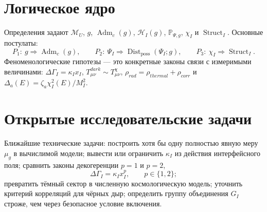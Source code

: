 \documentclass[12pt,a4paper]{article}
\DeclareMathOperator{\Adm}{Adm}
\DeclareMathOperator{\Struct}{Struct}
\DeclareMathOperator{\Dist}{Dist}
\newcommand{\M}{\mathcal M_U}
\newcommand{\Hilb}{\mathcal H}
\newcommand{\Prob}{\mathbb P}
\begin{document}
\section{Логическое ядро}
Определения задают $\M$, $g$, $\Adm_c(g)$, $\Hilb_I(g)$, $\Prob_{\Psi,g}$, $\chi_I$ и $\Struct_I$. Основные постулаты:
\[
\boxed{P_1:\ g\Rightarrow\Adm_c(g),}
\qquad
\boxed{P_2:\ \Psi_I\Rightarrow\Dist_{\mathrm{poss}}(\Psi_I;g),}
\qquad
\boxed{P_3:\ \chi_I\Rightarrow\Struct_I.}
\]
Феноменологические гипотезы — это конкретные законы связи с измеримыми величинами: $\Delta\Gamma_I=\kappa_Ix_I$, $T_{\mu\nu}^{dark}\sim T_{\mu\nu}^{\chi}$, $\rho_{rad}=\rho_{thermal}+\rho_{corr}$ и $\Delta_a(E)=\zeta_a\chi_I^2(E)/M_I^2$.

\section{Открытые исследовательские задачи}
Ближайшие технические задачи: построить хотя бы одну полностью явную меру $\mu_g$ в вычислимой модели; вывести или ограничить $\kappa_I$ из действия интерфейсного поля; сравнить законы декогеренции $p=1$ и $p=2$,
\[
\Delta\Gamma_I=\kappa_Ix_I^p,
\qquad p\in\{1,2\};
\]
превратить тёмный сектор в численную космологическую модель; уточнить критерий корреляций для чёрных дыр; определить группу объединения $G_I$ строже, чем через безопасное условие включения.
\end{document}

